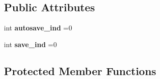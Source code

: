 \subsection*{Public Attributes}
\begin{DoxyCompactItemize}
\item 
int {\bfseries autosave\+\_\+ind} =0\hypertarget{classgui_1_1DesignPanel_aca6335177a4b1c1838530d6211483dfe}{}\label{classgui_1_1DesignPanel_aca6335177a4b1c1838530d6211483dfe}

\item 
int {\bfseries save\+\_\+ind} =0\hypertarget{classgui_1_1DesignPanel_a0f3e228582a4f986c90865392d911cea}{}\label{classgui_1_1DesignPanel_a0f3e228582a4f986c90865392d911cea}

\end{DoxyCompactItemize}
\subsection*{Protected Member Functions}
